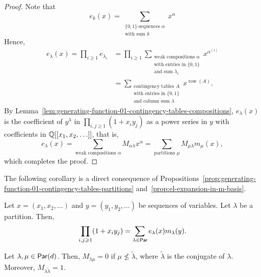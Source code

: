 \begin{proof}
	Note that 
	\begin{equation}
		e_k(x)
		= \sum_{\substack{\{0, 1\}\text{-sequences } \alpha \\ \text{with sum } k}}
			x^\alpha
	\end{equation}
	Hence,
	\begin{align}
		e_\lambda(x)
		= \prod_{i\geq 1} e_{\lambda_i}
		&= \prod_{i\geq 1}
			\sum_{\substack{\text{weak compositions } \alpha \\ \text{with entries in } \{0, 1\} \\ \text{and sum } \lambda_i}}
				x^{\alpha^{(i)}} \\
		&= \sum_{\substack{\text{contingency tables } A \\ \text{with entries in } \{0, 1\} \\ \text{and column sum } \lambda}}
			x^{\operatorname{row}(A)}.
	\end{align}
	By Lemma~\ref{lem:generating-function-01-contingency-tables-compositions},
	\(e_\lambda(x)\) is the coefficient of \(y^\lambda\) in \(\prod_{i, j \geq 1} (1 + x_iy_j)\) as a power series in \(y\) with coefficients in \(\mathbb{Q}[[x_1, x_2, \ldots]]\),
	that is,
	\begin{equation}
		e_\lambda(x) = \sum_{\text{weak compositions } \alpha} M_{\alpha\lambda} x^\alpha = \sum_{\text{partitions } \mu} M_{\mu\lambda} m_\mu(x),
	\end{equation}
	which completes the proof.
\end{proof}

The following corollary is a direct consequence of Propositions~\ref{prop:generating-function-01-contingency-tables-partitions} and~\ref{prop:el-expansion-in-m-basis}.

\begin{corollary}
	Let \(x = (x_1, x_2, \ldots)\) and \(y = (y_1, y_2, \ldots)\) be sequences of variables.
	Let \(\lambda\) be a partition.
	Then,
	\begin{equation}
		\prod_{i, j \geqslant 1} (1 + x_iy_j) = \sum_{\lambda \in \operatorname{\mathsf{Par}}} e_\lambda(x) m_\lambda(y).
	\end{equation}	
\end{corollary}

\begin{lemma}
    Let \(\lambda, \mu \in \operatorname{\mathsf{Par}}(d)\).
    Then, \(M_{\lambda\mu} = 0\) if \(\mu \not\leq \tilde{\lambda}\),
    where \(\tilde{\lambda}\) is the conjugate of \(\lambda\).
    Moreover, \(M_{\lambda\tilde{\lambda}} = 1\).
\end{lemma}


